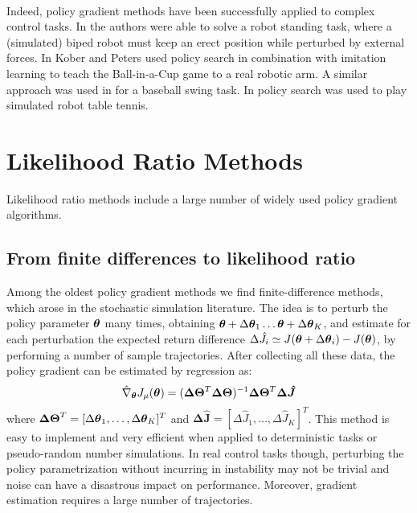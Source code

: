 \paragraph{} %
Indeed, policy gradient methods have been successfully applied to complex control tasks. In \cite{Sehnke2008policy} the authors were able to solve a robot standing task, where a (simulated) biped robot must keep an erect position while perturbed by external forces. In \cite{kober_NIPS2008} Kober and Peters used policy search in combination with imitation learning to teach the Ball-in-a-Cup game to a real robotic arm. A similar approach was used in \cite{Peters2008natural} for a baseball swing task. In \cite{peters2010relative} policy search was used to play simulated robot table tennis. 


\section{Likelihood Ratio Methods}
Likelihood ratio methods include a large number of widely used policy gradient algorithms. 

\subsection{From finite differences to likelihood ratio}
Among the oldest policy gradient methods we find finite-difference methods, which arose in the stochastic simulation literature. The idea is to perturb the policy parameter $\boldsymbol{\theta}$ many times, obtaining $\boldsymbol{\theta}+\Delta\boldsymbol{\theta}_1 \dots \boldsymbol{\theta}+\Delta\boldsymbol{\theta}_K$, and estimate for each perturbation the expected return difference $\Delta\hat{J}_i \simeq J(\boldsymbol{\theta}+\Delta\boldsymbol{\theta}_i) - J(\boldsymbol{\theta})$, by performing a number of sample trajectories. After collecting all these data, the policy gradient can be estimated by regression as:
\[
	\hat{\nabla}_{\boldsymbol{\theta}}J_{\mu}(\boldsymbol{\theta}) = (\boldsymbol{\Delta\Theta}^T\boldsymbol{\Delta\Theta})^{-1}\boldsymbol{\Delta\Theta}^T\boldsymbol{\Delta\hat{J}}
\]
where $\boldsymbol{\Delta\Theta}^T = [\Delta\boldsymbol{\theta}_1,\dots,\Delta\boldsymbol{\theta}_K]^T$ and $\boldsymbol{\Delta\hat{J}} = [\Delta\hat{J}_1,\dots,\Delta\hat{J}_K]^T$. This method is easy to implement and very efficient when applied to deterministic tasks or pseudo-random number simulations. In real control tasks though, perturbing the policy parametrization without incurring in instability may not be trivial and noise can have a disastrous impact on performance. Moreover, gradient estimation requires a large number of trajectories.

